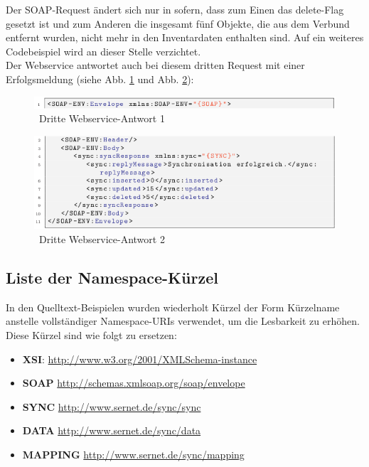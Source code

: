 \documentclass[a4paper,10pt]{book}
\begin{document}
\newline
Der SOAP-Request ändert sich nur in sofern, dass zum Einen das delete-Flag gesetzt ist und zum Anderen die insgesamt fünf Objekte,
die aus dem Verbund entfernt wurden, nicht mehr in den Inventardaten enthalten sind. Auf ein weiteres Codebeispiel wird an dieser Stelle verzichtet.
\newline\\
Der Webservice antwortet auch bei diesem dritten Request mit einer Erfolgsmeldung (siehe Abb. \ref{Dritte Webservice-Antwort 1} und Abb. \ref{Dritte Webservice-Antwort 2}):
\newline
\begin{figure}[htb!]
  \centering
  \includegraphics[scale=.7]{Screenshot/SyncAPI_Fallstudie_13.png}
  \caption{\label{Dritte Webservice-Antwort 1} \ Dritte Webservice-Antwort 1}
\end{figure}
\newline
\begin{figure}[htb!]
  \centering
  \includegraphics[scale=.7]{Screenshot/SyncAPI_Fallstudie_14.png}
  \caption{\label{Dritte Webservice-Antwort 2} \ Dritte Webservice-Antwort 2}
\end{figure}
\newline

\subsection{ Liste der Namespace-Kürzel}
In den Quelltext-Beispielen wurden wiederholt Kürzel der Form {Kürzelname} anstelle vollständiger Namespace-URIs verwendet, um die Lesbarkeit zu erhöhen. Diese Kürzel sind wie folgt zu ersetzen:
\begin{itemize}
 \item \textbf{XSI}: \href{http://www.w3.org/2001/XMLSchema-instance}{http://www.w3.org/2001/XMLSchema-instance}
 \item \textbf{SOAP} \href{http://schemas.xmlsoap.org/soap/envelope}{http://schemas.xmlsoap.org/soap/envelope}
 \item \textbf{SYNC} \href{http://www.sernet.de/sync/sync}{http://www.sernet.de/sync/sync}
 \item \textbf{DATA} \href{http://www.sernet.de/sync/data}{http://www.sernet.de/sync/data}
 \item \textbf{MAPPING} \href{http://www.sernet.de/sync/mapping}{http://www.sernet.de/sync/mapping}
\end{itemize}
\end{document}
